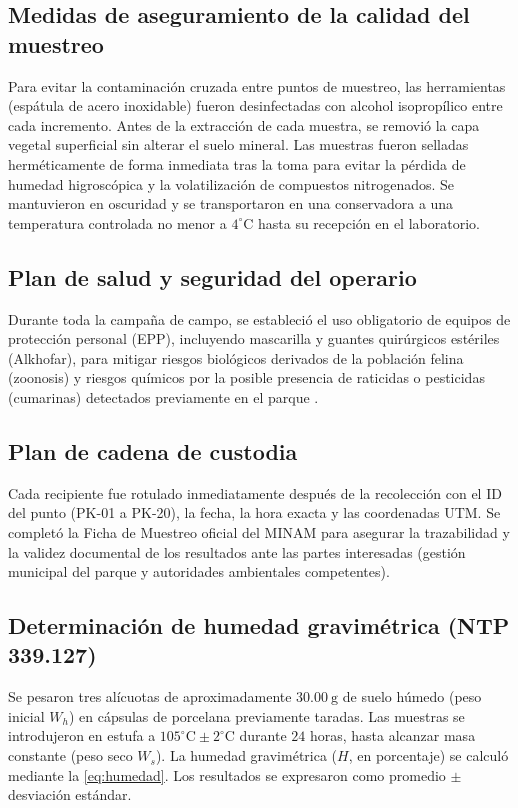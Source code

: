 \documentclass[fleqn]{jaes}
\begin{document}
\subsection{Medidas de aseguramiento de la calidad del muestreo}

Para evitar la contaminación cruzada entre puntos de muestreo, las herramientas (espátula de acero inoxidable) fueron desinfectadas con alcohol isopropílico entre cada incremento. Antes de la extracción de cada muestra, se removió la capa vegetal superficial sin alterar el suelo mineral. Las muestras fueron selladas herméticamente de forma inmediata tras la toma para evitar la pérdida de humedad higroscópica y la volatilización de compuestos nitrogenados. Se mantuvieron en oscuridad y se transportaron en una conservadora a una temperatura controlada no menor a $4^\circ\text{C}$ hasta su recepción en el laboratorio.

\subsection{Plan de salud y seguridad del operario}

Durante toda la campaña de campo, se estableció el uso obligatorio de equipos de protección personal (EPP), incluyendo mascarilla y guantes quirúrgicos estériles (Alkhofar), para mitigar riesgos biológicos derivados de la población felina (zoonosis) y riesgos químicos por la posible presencia de raticidas o pesticidas (cumarinas) detectados previamente en el parque \cite{CentrodeMedicinaVeterinariaForense2023}.

\subsection{Plan de cadena de custodia}

Cada recipiente fue rotulado inmediatamente después de la recolección con el ID del punto (PK-01 a PK-20), la fecha, la hora exacta y las coordenadas UTM. Se completó la Ficha de Muestreo oficial del MINAM para asegurar la trazabilidad y la validez documental de los resultados ante las partes interesadas (gestión municipal del parque y autoridades ambientales competentes).

\subsection{Determinación de humedad gravimétrica (NTP 339.127)}

Se pesaron tres alícuotas de aproximadamente $30.00~\text{g}$ de suelo húmedo (peso inicial $W_h$) en cápsulas de porcelana previamente taradas. Las muestras se introdujeron en estufa a $105^\circ\text{C} \pm 2^\circ\text{C}$ durante $24$ horas, hasta alcanzar masa constante (peso seco $W_s$). La humedad gravimétrica ($H$, en porcentaje) se calculó mediante la \cref{eq:humedad}. Los resultados se expresaron como promedio $\pm$ desviación estándar.
\end{document}
